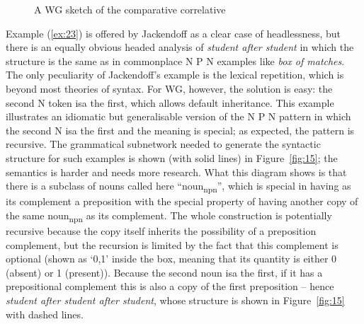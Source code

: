 \documentclass[output=paper]{langscibook}
\begin{document}
\begin{figure}
	\centering
{}
	\caption{A WG sketch of the comparative correlative}
	\label{fig:14}
\end{figure}

Example (\ref{ex:23}) is offered by Jackendoff as a clear case of headlessness, but there is an equally obvious headed analysis of \emph{student after student} in which the structure is the same as in commonplace N P N examples like \emph{box of matches}. The only peculiarity of Jackendoff’s example is the lexical repetition, which is beyond most theories of syntax. For WG, however, the solution is easy: the second N token isa the first, which allows default inheritance. This example illustrates an idiomatic but generalisable version of the N P N pattern in which the second N isa the first and the meaning is special; as expected, the pattern is recursive. The grammatical subnetwork needed to generate the syntactic structure for such examples is shown (with solid lines) in Figure~\ref{fig:15}; the semantics is harder and needs more research. What this diagram shows is that there is a subclass of nouns called here ``noun\textsubscript{npn}'', which is special in having as its complement a preposition with the special property of having another copy of the same noun\textsubscript{npn} as its complement. The whole construction is potentially recursive because the copy itself inherits the possibility of a preposition complement, but the recursion is limited by the fact that this complement is optional (shown as ‘0,1’ inside the box, meaning that its quantity is either 0 (absent) or 1 (present)). Because the second noun isa the first, if it has a prepositional complement this is also a copy of the first preposition – hence \emph{student after student after student}, whose structure is shown in Figure~\ref{fig:15} with dashed lines.
\end{document}
